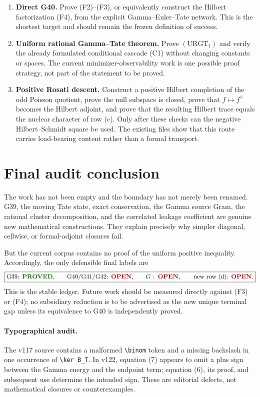 \documentclass[11pt]{article}
\newcommand{\PROVED}{\textcolor{green!45!black}{\textbf{PROVED}}}
\newcommand{\OPEN}{\textcolor{red!70!black}{\textbf{OPEN}}}
\begin{document}
\begin{enumerate}
\item \textbf{Direct G40.}  Prove (F2)--(F3), or equivalently construct the
Hilbert factorization (F4), from the explicit Gamma--Euler--Tate network.  This is
the shortest target and should remain the frozen definition of success.

\item \textbf{Uniform rational Gamma--Tate theorem.}  Prove
\((\mathrm{URGT}_1)\) and verify the already formulated conditional cascade (C1)
without changing constants or spaces.  The current minimizer-observability work is
one possible proof strategy, not part of the statement to be proved.

\item \textbf{Positive Rosati descent.}  Construct a positive Hilbert completion
of the odd Poisson quotient, prove the null subspace is closed, prove that
\(f\mapsto f^\vee\) becomes the Hilbert adjoint, and prove that the resulting
Hilbert trace equals the nuclear character of row (c).  Only after these checks can
the negative Hilbert--Schmidt square be used.  The existing files show that this
route carries load-bearing content rather than a formal transport.
\end{enumerate}

\section{Final audit conclusion}

The work has not been empty and the boundary has not merely been renamed.  G39,
the moving Tate state, exact conservation, the Gamma source Gram, the rational
cluster decomposition, and the correlated leakage coefficient are genuine new
mathematical constructions.  They explain precisely why simpler diagonal,
cellwise, or formal-adjoint closures fail.

But the current corpus contains no proof of the uniform positive inequality.
Accordingly, the only defensible final labels are
\[
 \boxed{
 \text{G39: \PROVED,}\qquad
 \text{G40/G41/G42: \OPEN,}\qquad
 G:\ \OPEN,\qquad
 \text{new row (d): \OPEN.}}
\]
This is the stable ledger.  Future work should be measured directly against (F3)
or (F4); no subsidiary reduction is to be advertised as the new unique terminal
gap unless its equivalence to G40 is independently proved.

\paragraph{Typographical audit.}
The v117 source contains a malformed \verb|\binom| token and a missing backslash
in one occurrence of \verb|\ker B_T|.  In v122, equation (7) appears to omit a
plus sign between the Gamma energy and the endpoint term; equation (6), its proof,
and subsequent use determine the intended sign.  These are editorial defects, not
mathematical closures or counterexamples.
\end{document}
